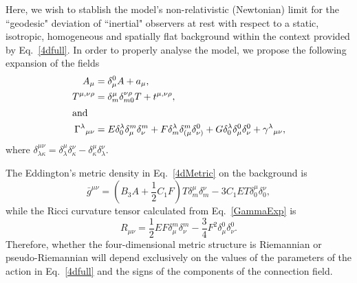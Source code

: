 \documentclass{ws-mpla}
\renewcommand{\(}{\left(}
\renewcommand{\)}{\right)}
\renewcommand{\[}{\left[}
\renewcommand{\]}{\right]}
\begin{document}
Here, we wish to stablish the model's non-relativistic (Newtonian) limit for the ``geodesic" deviation of ``inertial" observers at rest with respect to a static, isotropic, homogeneous and spatially flat background within the context provided by Eq.~\eqref{4dfull}. In order to properly analyse the model, we  propose the following expansion of the fields
\begin{align}
  A_\mu &= \delta_\mu^0 A + a_\mu,\\
  T^{\mu,\nu\rho} &= \delta^{\mu}_m\delta^{\nu\rho}_{m0}T + t^{\mu,\nu\rho},\\
  \shortintertext{and}
  \Gamma^\lambda{}_{\mu\nu} &= E \delta^\lambda_0 \delta^m_\mu \delta^m_\nu + F \delta^\lambda_m \delta^m_{(\mu}\delta^0_{\nu)} + G\delta^\lambda_0 \delta^0_{\mu}\delta^0_{\nu} + \gamma^\lambda{}_{\mu\nu},
  \label{GammaExp}
\end{align}
where $\delta^{\mu\nu}_{\lambda\kappa}=\delta^{\mu}_{\lambda}\delta^{\nu}_{\kappa}-\delta^{\mu}_{\kappa}\delta^{\nu}_{\lambda}$.



The Eddington's metric density in Eq.~\eqref{4dMetric}  on the background is
\begin{dmath}
  \label{3+1metric}
  \bar{g}^{\mu\nu} = \left(B_3 A + \frac{1}{2}C_1 F\right) T \delta^\mu_m \delta^\nu_m - 3 C_1 E T \delta^\mu_0\delta^\nu_0,
\end{dmath}
while the Ricci curvature tensor calculated from Eq.~\eqref{GammaExp} is
\begin{dmath}
  R_{\mu\nu} = \frac{1}{2} E F \delta^m_\mu \delta^m_\nu - \frac{3}{4} F^2 \delta^0_\mu \delta^0_\nu.
\end{dmath}
Therefore, whether the four-dimensional metric structure is Riemannian or pseudo-Riemannian will depend exclusively on the values of the parameters of the action in Eq.~\eqref{4dfull} and the signs of the components of the connection field. 
\end{document}
